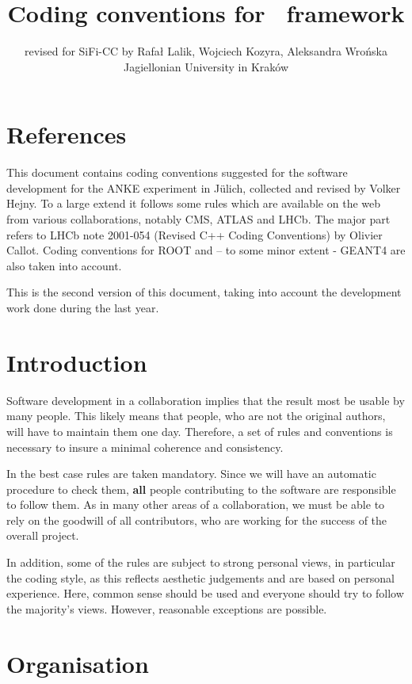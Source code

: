 \documentclass[a4paper,10pt]{article}
\title{Coding conventions for \sificc\ framework}
\author{\small revised for SiFi-CC by Rafał Lalik, Wojciech Kozyra, Aleksandra Wrońska\\
\small Jagiellonian University in Kraków}
\begin{document}
\maketitle

\section{References}

This document contains coding conventions suggested for the
software development for the ANKE experiment in J\"ulich, collected and revised by Volker Hejny.
To a large extend it follows some rules
which are available on the web from various collaborations,
notably CMS, ATLAS and LHCb. The major part refers to
LHCb note 2001-054 (Revised C++ Coding Conventions) by Olivier Callot.
Coding conventions for ROOT and -- to some minor extent - GEANT4 are
also taken into account.

This is the second version of this document, taking into account the
development work done during the last year.

\section{Introduction}

Software development in a collaboration implies that the result most be
usable by many people. This likely means that people, who are not the original
authors, will have to maintain them one day. Therefore, a set of rules and
conventions is necessary to insure a minimal coherence and consistency.

In the best case rules are taken mandatory. Since we will have an automatic
procedure to check them, {\bf all} people contributing to the software are
responsible to follow them.
As in many other areas of a collaboration, we must be able to rely on
the goodwill of all contributors, who are working for the success of
the overall project.

In addition, some of the rules are subject to strong personal views,
in particular the coding style, as this reflects aesthetic judgements
and are based on personal experience. Here, common sense should be used and
everyone should try to follow the majority's views. However, reasonable
exceptions are possible.

\section{Organisation}
\end{document}
